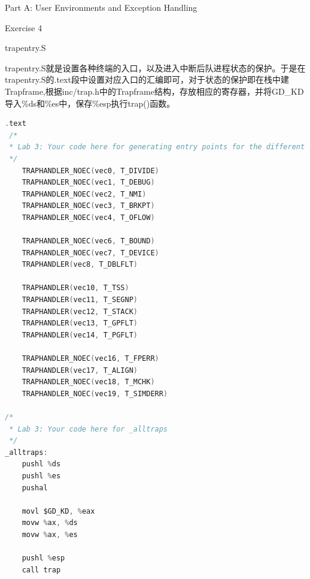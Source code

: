 \documentclass[GBK,winfonts,a4paper,10pt]{ctexart}
\begin{document}
\begin{section}{ Part A: User Environments and Exception Handling }
\begin{subsection}{ Exercise 4 }
\begin{subsubsection}{ trapentry.S }
\par
trapentry.S就是设置各种终端的入口，以及进入中断后队进程状态的保护。于是在trapentry.S的.text段中设置对应入口的汇编即可，对于状态的保护即在栈中建Trapframe,根据inc/trap.h中的Trapframe结构，存放相应的寄存器，并将GD\_KD导入\%ds和\%es中，保存\%esp执行trap()函数。
\begin{lstlisting}[language=C]
.text
 /*
 * Lab 3: Your code here for generating entry points for the different traps.
 */
 	TRAPHANDLER_NOEC(vec0, T_DIVIDE)
 	TRAPHANDLER_NOEC(vec1, T_DEBUG)
 	TRAPHANDLER_NOEC(vec2, T_NMI)
 	TRAPHANDLER_NOEC(vec3, T_BRKPT)
 	TRAPHANDLER_NOEC(vec4, T_OFLOW)

 	TRAPHANDLER_NOEC(vec6, T_BOUND)
	TRAPHANDLER_NOEC(vec7, T_DEVICE)
 	TRAPHANDLER(vec8, T_DBLFLT)

 	TRAPHANDLER(vec10, T_TSS)
 	TRAPHANDLER(vec11, T_SEGNP)
 	TRAPHANDLER(vec12, T_STACK)
 	TRAPHANDLER(vec13, T_GPFLT)
 	TRAPHANDLER(vec14, T_PGFLT) 

 	TRAPHANDLER_NOEC(vec16, T_FPERR)
 	TRAPHANDLER(vec17, T_ALIGN)
 	TRAPHANDLER_NOEC(vec18, T_MCHK)
 	TRAPHANDLER_NOEC(vec19, T_SIMDERR)

/*
 * Lab 3: Your code here for _alltraps
 */
_alltraps:
	pushl %ds
	pushl %es
	pushal

	movl $GD_KD, %eax
	movw %ax, %ds
	movw %ax, %es

	pushl %esp
	call trap
\end{lstlisting}
\end{subsubsection}


\end{subsection}
\end{section}
\end{document}
